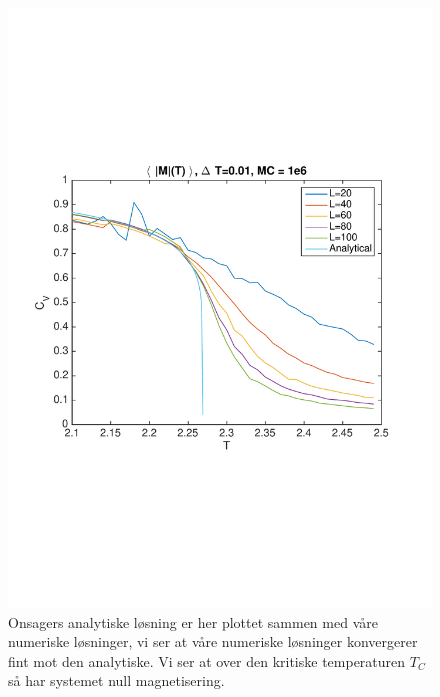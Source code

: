 \documentclass[norsk, 10pt]{article}
\begin{document}
\begin{figure}[H]
	\centering
	\includegraphics[scale = 0.6, trim = 1cm 8cm 1cm 8cm]{avg_mag_num_anal.pdf}
	\caption{Onsagers analytiske løsning er her plottet sammen med våre numeriske løsninger, vi ser at våre numeriske løsninger konvergerer fint mot den analytiske. Vi ser at over den kritiske temperaturen $T_C$ så har systemet null magnetisering.}
	\label{fig:avgmagnumanal}
\end{figure}
\end{document}
